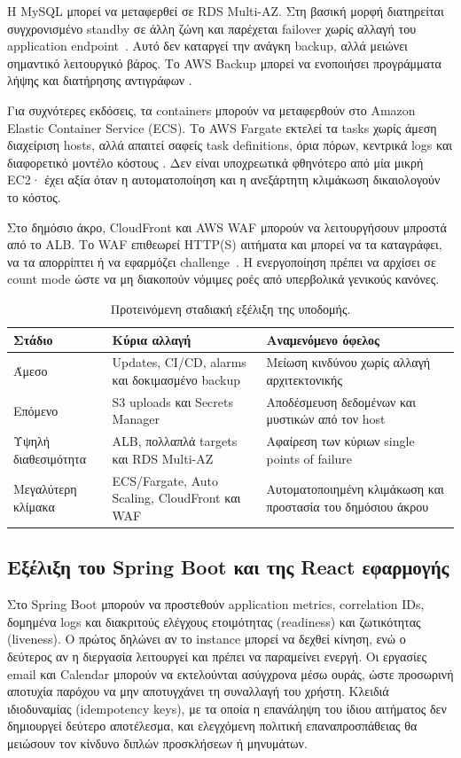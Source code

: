 Η MySQL μπορεί να μεταφερθεί σε RDS Multi-AZ. Στη βασική μορφή διατηρείται
συγχρονισμένο standby σε άλλη ζώνη και παρέχεται failover χωρίς αλλαγή του
application endpoint~\cite{aws2026rdsmultiaz}. Αυτό δεν καταργεί την ανάγκη
backup, αλλά μειώνει σημαντικό λειτουργικό βάρος. Το AWS Backup μπορεί να
ενοποιήσει προγράμματα λήψης και διατήρησης αντιγράφων
\cite{aws2026backup}.

Για συχνότερες εκδόσεις, τα containers μπορούν να μεταφερθούν στο Amazon
Elastic Container Service (ECS). Το AWS Fargate εκτελεί τα tasks χωρίς άμεση
διαχείριση hosts, αλλά απαιτεί σαφείς task definitions,
όρια πόρων, κεντρικά logs και διαφορετικό μοντέλο κόστους
\cite{aws2026fargate}. Δεν είναι υποχρεωτικά φθηνότερο από μία μικρή EC2· έχει
αξία όταν η αυτοματοποίηση και η ανεξάρτητη κλιμάκωση δικαιολογούν το κόστος.

Στο δημόσιο άκρο, CloudFront και AWS WAF μπορούν να λειτουργήσουν μπροστά από
το ALB. Το WAF επιθεωρεί HTTP(S) αιτήματα και μπορεί να τα καταγράφει, να τα
απορρίπτει ή να εφαρμόζει challenge~\cite{aws2026waf}. Η ενεργοποίηση πρέπει
να αρχίσει σε count mode ώστε να μη διακοπούν νόμιμες ροές από υπερβολικά
γενικούς κανόνες.

\begin{table}[htbp]
\centering
\caption{Προτεινόμενη σταδιακή εξέλιξη της υποδομής.}
\label{tab:future-roadmap}
\small
\begin{tabularx}{\textwidth}{@{}p{2.7cm}p{4.2cm}X@{}}
\toprule
\textbf{Στάδιο} & \textbf{Κύρια αλλαγή} & \textbf{Αναμενόμενο όφελος} \\
\midrule
Άμεσο & Updates, CI/CD, alarms και δοκιμασμένο backup & Μείωση κινδύνου χωρίς αλλαγή αρχιτεκτονικής \\
Επόμενο & S3 uploads και Secrets Manager & Αποδέσμευση δεδομένων και μυστικών από τον host \\
Υψηλή διαθεσιμότητα & ALB, πολλαπλά targets και RDS Multi-AZ & Αφαίρεση των κύριων single points of failure \\
Μεγαλύτερη κλίμακα & ECS/Fargate, Auto Scaling, CloudFront και WAF & Αυτοματοποιημένη κλιμάκωση και προστασία του δημόσιου άκρου  \\
\bottomrule
\end{tabularx}
\end{table}

\subsection{Εξέλιξη του Spring Boot και της React εφαρμογής}
Στο Spring Boot μπορούν να προστεθούν application metrics, correlation IDs,
δομημένα logs και διακριτούς ελέγχους ετοιμότητας (readiness) και ζωτικότητας
(liveness). Ο πρώτος δηλώνει αν το instance μπορεί να δεχθεί κίνηση, ενώ ο
δεύτερος αν η διεργασία λειτουργεί και πρέπει να παραμείνει ενεργή. Οι εργασίες email
και Calendar μπορούν να εκτελούνται ασύγχρονα μέσω ουράς, ώστε προσωρινή
αποτυχία παρόχου να μην αποτυγχάνει τη συναλλαγή του χρήστη. Κλειδιά
ιδιοδυναμίας (idempotency keys), με τα οποία η επανάληψη του ίδιου αιτήματος
δεν δημιουργεί δεύτερο αποτέλεσμα, και ελεγχόμενη πολιτική επαναπροσπάθειας
θα μειώσουν τον κίνδυνο διπλών προσκλήσεων ή μηνυμάτων.


